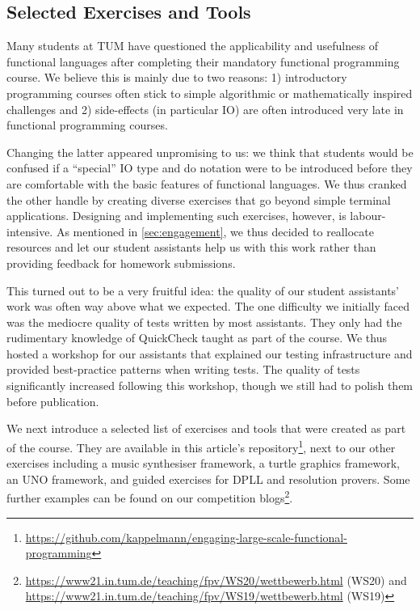 \subsection{Selected Exercises and Tools}\label{sec:selected_exercises}

Many students at TUM have questioned the
applicability and usefulness
of functional languages after completing
their mandatory functional programming course.
We believe this is mainly due to two reasons:
1) introductory programming courses often stick
to simple algorithmic or mathematically inspired challenges and
2) side-effects (in particular IO)
are often introduced very late
in functional programming courses.

Changing the latter appeared unpromising to us:
we think that students would be confused
if a ``special'' IO type and do notation were to
be introduced before they are comfortable
with the basic features of functional
languages.
We thus cranked the other handle
by creating diverse exercises that go beyond
simple terminal applications.
Designing and implementing such exercises,
however, is labour-intensive.
As mentioned in \cref{sec:engagement},
we thus decided to reallocate resources and
let our student assistants help us with this work
rather than providing feedback for homework submissions.

This turned out to be a very fruitful idea:
the quality of our student assistants' work was often way above what
we expected.
The one difficulty we initially faced was the mediocre quality of
tests written by most assistants.
They only had the rudimentary knowledge of QuickCheck taught as part of
the course.
We thus hosted a workshop for our assistants that explained
our testing infrastructure and provided best-practice
patterns when writing tests.
The quality of tests significantly increased following this workshop,
though we still had to polish them before publication.

We next introduce a selected list of exercises and tools
that were created as part of the course.
They are available in this article's repository\footnote{\url{https://github.com/kappelmann/engaging-large-scale-functional-programming}},
next to our other exercises including
a music synthesiser framework,
a turtle graphics framework,
an UNO framework,
and guided exercises for DPLL and resolution provers.
Some further examples can be found on our competition blogs\footnote{\url{https://www21.in.tum.de/teaching/fpv/WS20/wettbewerb.html} (WS20) and
\url{https://www21.in.tum.de/teaching/fpv/WS19/wettbewerb.html} (WS19)}.

